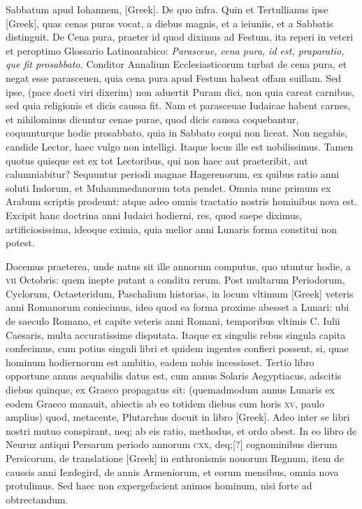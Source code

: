 Sabbatum apud Iohannem, \textgreek{[Greek]}.
De quo infra.
Quin et Tertullianus ipse \textgreek{[Greek]},
quas cenas puras vocat, a diebus magnis, et a ieiuniis, et a
Sabbatis distinguit.
De Cena pura, praeter id quod diximus ad
Festum, ita reperi in veteri et peroptimo Glossario Latinoarabico:
\textit{Parasceue, cena pura, id est, praparatio, que fit prosabbato.}
Conditor Annalium Ecclesiasticorum turbat de cena
pura, et negat esse parasceuen, quia cena pura apud Festum
habeat offam suillam.
Sed ipse, (pace docti viri dixerim) non
aduertit Puram dici, non quia careat carnibus, sed quia religionis
et dicis caussa fit.
Nam et parasceuae Iudaicae habent carnes,
et nihilominus dicuntur cenae purae, quod dicis caussa coquebantur,
coquunturque hodie prosabbato, quia in Sabbato
coqui non liceat.
Non negabis, candide Lector, haec vulgo non intelligi.
Itaque locus ille est nobilissimus. 
Tamen quotus quisque est ex tot Lectoribus, qui non haec
 aut praeteribit,
aut calumniabitur?
Sequuntur periodi magnae Hagerenorum,
ex quibus ratio anni soluti Indorum, et Muhammedanorum
tota pendet.
Omnia nunc primum ex Arabum scriptis
prodeunt: atque adeo omnis tractatio nostris hominibus
nova est.
Excipit hanc doctrina anni Iudaici hodierni, res, quod
saepe diximus, artificiosissima, ideoque eximia, quia melior
anni Lunaris forma constitui non potest.

Docemus praeterea, unde
natus sit ille annorum computus, quo utuntur hodie, a \textsc{vii} Octobris:
quem inepte putant a conditu rerum.
Post multarum Periodorum,
Cyclorum, Octaeteridum, Paschalium historias, in locum vltimum
\textgreek{[Greek]} veteris anni Romanorum coniecimus, ideo
quod ea forma proxime abesset a Lunari: ubi de saeculo Romano,
et capite veteris anni Romani, temporibus vltimis C. Iulii Caesaris,
multa accuratissime disputata.
Itaque ex singulis rebus singula capita
confecimus, cum potius singuli libri et quidem ingentes confieri
possent, si, quae hominum hodiernorum est ambitio, eadem nobis
incessisset.
Tertio libro opportune annus aequabilis datus est,
cum annus Solaris Aegyptiacus, adscitis diebus quinque, ex Graeco
propagatus sit: (quemadmodum annus Lunaris ex eodem Graeco
manauit, abiectis ab eo totidem diebus cum horis \textsc{xv}, paulo amplius)
quod, metacente, Plutarchus docuit in libro \textgreek{[Greek]}.
Adeo inter se libri nostri mutuo conspirant, neq; ab eis ratio,
methodus, et ordo abest.
In eo libro de Neuruz antiqui Persarum
periodo annorum \textsc{cxx}, deq;[?] cognominibus dierum Persicorum,
de translatione \textgreek{[Greek]} in enthronismis nouorum Regnum,
item de caussis anni Iezdegird, de annis Armeniorum, et eorum
mensibus, omnia nova protulimus. 
Sed haec non expergefacient animos
hominum, nisi forte ad obtrectandum.

